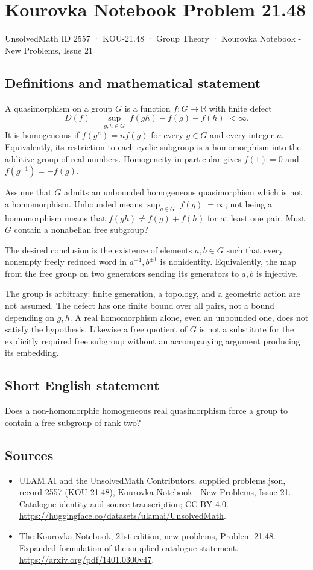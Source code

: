\documentclass[11pt,a4paper]{article}
\begin{document}
\section*{Kourovka Notebook Problem 21.48}\label{2557}
{\small UnsolvedMath ID 2557 · KOU-21.48 · Group Theory · Kourovka Notebook - New Problems, Issue 21}
\subsection{Definitions and mathematical statement}
A quasimorphism on a group $G$ is a function $f:G\to\mathbb R$ with
finite defect
\[
 D(f)=\sup_{g,h\in G}|f(gh)-f(g)-f(h)|<\infty.
\]
It is homogeneous if $f(g^n)=nf(g)$ for every $g\in G$ and every
integer $n$. Equivalently, its restriction to each cyclic subgroup is
a homomorphism into the additive group of real numbers. Homogeneity
in particular gives $f(1)=0$ and $f(g^{-1})=-f(g)$.

Assume that $G$ admits an unbounded homogeneous quasimorphism which is
not a homomorphism. Unbounded means $\sup_{g\in G}|f(g)|=\infty$;
not being a homomorphism means that $f(gh)\ne f(g)+f(h)$ for at least
one pair. Must $G$ contain a nonabelian free subgroup?

The desired conclusion is the existence of elements $a,b\in G$ such
that every nonempty freely reduced word in $a^{\pm1},b^{\pm1}$ is
nonidentity. Equivalently, the map from the free group on two generators
sending its generators to $a,b$ is injective.

The group is arbitrary: finite generation, a topology, and a geometric
action are not assumed. The defect has one finite bound over all pairs,
not a bound depending on $g,h$. A real homomorphism alone, even an
unbounded one, does not satisfy the hypothesis. Likewise a free quotient
of $G$ is not a substitute for the explicitly required free subgroup
without an accompanying argument producing its embedding.
\subsection{Short English statement}
Does a non-homomorphic homogeneous real quasimorphism force a group to contain a free subgroup of rank two?
\subsection{Sources}
\begin{itemize}
\item[S1] ULAM.AI and the UnsolvedMath Contributors, supplied problems.json, record 2557 (KOU-21.48), Kourovka Notebook - New Problems, Issue 21. Catalogue identity and source transcription; CC BY 4.0.
\url{https://huggingface.co/datasets/ulamai/UnsolvedMath}.
\item[S2] The Kourovka Notebook, 21st edition, new problems, Problem 21.48. Expanded formulation of the supplied catalogue statement.
\url{https://arxiv.org/pdf/1401.0300v47}.
\end{itemize}
\end{document}
